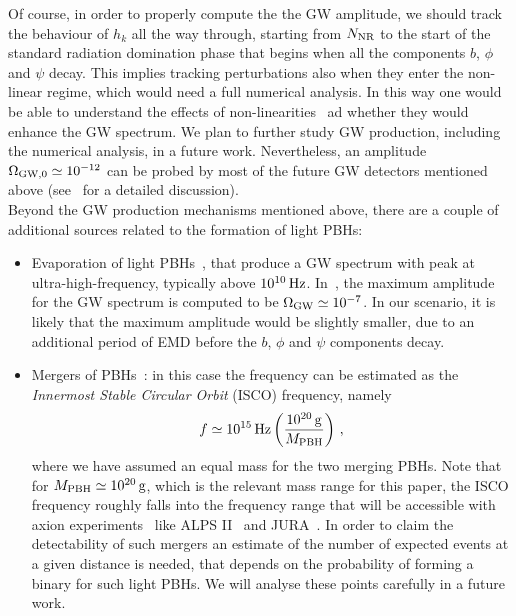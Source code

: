\documentclass[a4paper, amsfonts, amssymb, amsmath, reprint, showkeys, nofootinbib, twoside, superscriptaddress]{revtex4-1}
\begin{document}
Of course, in order to properly compute the the GW amplitude, we should track the behaviour of $h_k$ all the way through, starting from $N_{\rm NR}$ to the start of the standard radiation domination phase that begins when all the components $b$, $\phi$ and $\psi$ decay. This implies tracking perturbations also when they enter the non-linear regime, which would need a full numerical analysis. In this way one would be able to understand the effects of non-linearities~\cite{Delos:2020mtj, Delos:2019tsl,Delos:2018ueo} ad whether they would enhance the GW spectrum. We plan to further study GW production, including the numerical analysis, in a future work. Nevertheless, an amplitude $\Omega_{{\rm GW}, 0} \simeq 10^{-12}$ can be probed by most of the future GW detectors mentioned above (see~\cite{Thrane:2013oya, Mingarelli:2019mvk} for a detailed discussion).\\

Beyond the GW production mechanisms mentioned above, there are a couple of additional sources related to the formation of light PBHs:
\begin{itemize}[leftmargin=*]
\item Evaporation of light PBHs~\cite{Anantua:2008am, Dolgov:2011cq}, that produce a GW spectrum with peak at ultra-high-frequency, typically above  $10^{10} \, \rm{Hz}$. In~\cite{Dolgov:2011cq}, the maximum amplitude for the GW spectrum is computed to be $\Omega_{\rm GW} \simeq 10^{-7}$. In our scenario, it is likely that the maximum amplitude would be slightly smaller, due to an additional period of EMD before the $b$, $\phi$ and $\psi$ components decay.
\item Mergers of PBHs~\cite{Zagorac:2019ekv, Dolgov:2011cq}: in this case the frequency can be estimated as the \textit{Innermost Stable Circular Orbit} (ISCO) frequency, namely
\begin{equation}
f \simeq 10^{15} \, {\rm Hz} \left(\frac{10^{20} \, {\rm g}}{M_{\rm PBH}}\right) \,,
\end{equation}
where we have assumed an equal mass for the two merging PBHs. Note that for $M_{\rm PBH} \simeq 10^{20} \, \rm{g}$, which is the relevant mass range for this paper, the ISCO frequency roughly falls into the frequency range that will be accessible with axion experiments~\cite{Ejlli:2019bqj} like ALPS II~\cite{Bahre:2013ywa} and JURA~\cite{doi:10.1146/annurev-nucl-102014-022120}. In order to claim the detectability of such mergers an estimate of the number of expected events at a given distance is needed, that depends on the probability of forming a binary for such light PBHs. We will analyse these points carefully in a future work.
\end{itemize}
\end{document}
